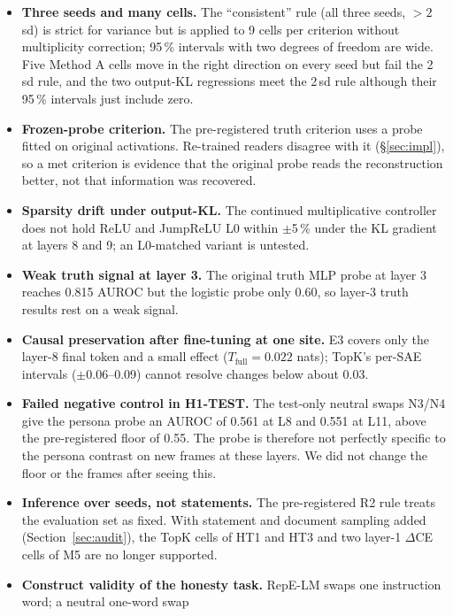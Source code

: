 \begin{itemize}
        layers 3, 8 and 9 without tuning; other budgets could change the classes.
  \item \textbf{Three seeds and many cells.} The ``consistent'' rule (all three seeds, $>2$\,sd) is strict for
        variance but is applied to 9 cells per criterion without multiplicity correction; 95\,\% intervals with two
        degrees of freedom are wide. Five Method A cells move in the right direction on every seed but fail the
        2\,sd rule, and the two output-KL regressions meet the 2\,sd rule although their 95\,\% intervals just include zero.
  \item \textbf{Frozen-probe criterion.} The pre-registered truth criterion uses a probe fitted on original
        activations. Re-trained readers disagree with it (\S\ref{sec:impl}), so a met criterion is evidence that the
        original probe reads the reconstruction better, not that information was recovered.
  \item \textbf{Sparsity drift under output-KL.} The continued multiplicative controller does not hold ReLU and
        JumpReLU L0 within $\pm$5\,\% under the KL gradient at layers 8 and 9; an L0-matched variant is untested.
  \item \textbf{Weak truth signal at layer 3.} The original truth MLP probe at layer 3 reaches 0.815 AUROC but the
        logistic probe only 0.60, so layer-3 truth results rest on a weak signal.
  \item \textbf{Causal preservation after fine-tuning at one site.} E3 covers only the layer-8 final token and a
        small effect ($T_{\text{full}}=0.022$ nats); TopK's per-SAE intervals ($\pm$0.06--0.09) cannot resolve changes
        below about 0.03.
  \item \textbf{Failed negative control in H1-TEST.} The test-only neutral swaps N3/N4 give the persona probe an
        AUROC of 0.561 at L8 and 0.551 at L11, above the pre-registered floor of 0.55. The probe is therefore not
        perfectly specific to the persona contrast on new frames at these layers. We did not change the floor or the
        frames after seeing this.
  \item \textbf{Inference over seeds, not statements.} The pre-registered R2 rule treats the evaluation set as fixed.
        With statement and document sampling added (Section~\ref{sec:audit}), the TopK cells of HT1 and HT3 and two
        layer-1 $\Delta$CE cells of M5 are no longer supported.
  \item \textbf{Construct validity of the honesty task.} RepE-LM swaps one instruction word; a neutral one-word swap

\end{itemize}
